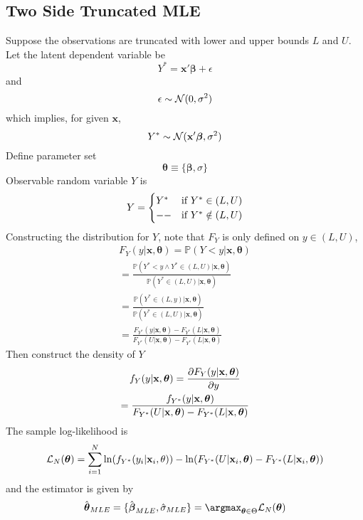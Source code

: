 \documentclass[11pt]{article}
\newcommand{\bm}[1]{\boldsymbol{#1}}
\begin{document}
		\subsection{Two Side Truncated MLE}
		\par Suppose the observations are truncated with lower and upper bounds $L$ and $U$. \\
		Let the latent dependent variable be 
		\begin{equation}
			Y^* = \textbf{x}' \bm{\beta} + \epsilon
		\end{equation}
		and 
		\begin{equation}
			\epsilon \sim \mathcal{{N}}(0, \sigma^2)
		\end{equation}
		which implies, for given $\textbf{x}$,
		\begin{equation}
			Y^* \sim \mc{N}(\textbf{x}' \bm{\beta}, \sigma^2)
		\end{equation}
		Define parameter set 
		\begin{equation}
			\bm{\theta} \equiv \{\bm{\beta}, \sigma\}	
		\end{equation}
		Observable random variable $Y$ is 
		\begin{equation}
			Y = \begin{cases}
				Y^* &\text{{if }} Y^* \in (L, U) \\
				-- &\text{{if }} Y^* \notin (L, U)
			\end{cases}
		\end{equation}
		Constructing the distribution for $Y$, note that $F_Y$ is only defined on $y \in (L, U)$,
		\begin{gather}
			F_Y(y|\textbf{x}, \bm{\theta}) = \mathbb{P}(Y<y|\textbf{x}, \bm{\theta})\\
			= \frac{\mathbb{P}(Y^* < y \land Y^* \in (L, U) | \textbf{x}, \bm{\theta})}{\mathbb{P}(Y^* \in (L, U)|\textbf{x}, \bm{\theta})} \\
			= \frac{\mathbb{P}(Y^* \in (L, y)|\textbf{x}, \bm{\theta})}{\mathbb{P}(Y^* \in (L,U)|\textbf{x}, \bm{\theta})} \\
			= \frac{F_{Y^*}(y|\textbf{x}, \bm{\theta}) - F_{Y^*}(L|\textbf{x}, \bm{\theta})}{F_{Y^*}(U|\textbf{x}, \bm{\theta}) - F_{Y^*}(L|\textbf{x}, \bm{\theta})}
		\end{gather}
		Then construct the density of $Y$ 
		\begin{gather}
			f_Y(y|\textbf{x}, \bm{\theta}) = \pd{F_Y(y|\textbf{x}, \bm{\theta})}{y} \\
			= \frac{f_{Y^*}(y|\textbf{x}, \bm{\theta})}{F_{Y^*}(U|\textbf{x}, \bm{\theta}) - F_{Y^*}(L|\textbf{x}, \bm{\theta})}
		\end{gather}
		The sample log-likelihood is
		\begin{gather}
			\mc{L}_N(\bm{\theta}) = \sum_{i=1}^N \ln(f_{Y^*}(y_i|\textbf{x}_i, \theta)) - \ln(F_{Y^*}(U|\textbf{x}_i, \bm{\theta}) - F_{Y^*}(L|\textbf{x}_i, \bm{\theta}))
		\end{gather}
		and the estimator is given by
		\begin{gather}
			\hat{\bm{\theta}}_{MLE} = \{
			\hat{\bm{\beta}}_{MLE}, \hat{\sigma}_{MLE}
			\} = \argmax_{\bm{\theta} \in \Theta} \mc{L}_N(\bm{\theta})
		\end{gather}
		
\end{document}
